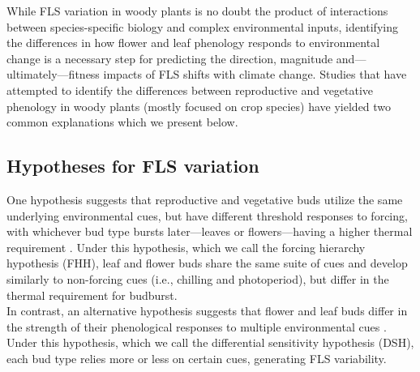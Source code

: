 \documentclass[12pt]{article}\usepackage[]{graphicx}\usepackage[]{color}
\begin{document}
\noindent While FLS variation in woody plants is no doubt the product of interactions between species-specific biology and complex environmental inputs, identifying the differences in how flower and leaf phenology responds to environmental change is a necessary step for predicting the direction, magnitude and---ultimately---fitness impacts of FLS shifts with climate change. Studies that have attempted to identify the differences between reproductive and vegetative phenology in woody plants (mostly focused on crop species) have yielded two common explanations which we present below.

\subsection*{Hypotheses for FLS variation}

\noindent One hypothesis suggests that reproductive and vegetative buds utilize the same underlying environmental cues, but have different threshold responses to forcing, with whichever bud type bursts later---leaves or flowers---having a higher thermal requirement \citep[that is, they need a greater sum of warm temperature to trigger the phenological event,][]{Guo2014,COSMULESCU:2020aa,Cosmulescu:2018aa}. Under this hypothesis, which we call the forcing hierarchy hypothesis (FHH), leaf and flower buds share the same suite of cues and develop similarly to non-forcing cues (i.e., chilling and photoperiod), but differ in the thermal requirement for budburst.\\

\noindent In contrast, an alternative hypothesis suggests that flower and leaf buds differ in the strength of their phenological responses to multiple environmental cues \citep{Citadin2001,Gariglio2006,Aslani2009,Mehlenbacher:1991aa}. Under this hypothesis, which we call the differential sensitivity hypothesis (DSH), each bud type relies more or less on certain cues, generating FLS variability.\\ 
\end{document}
